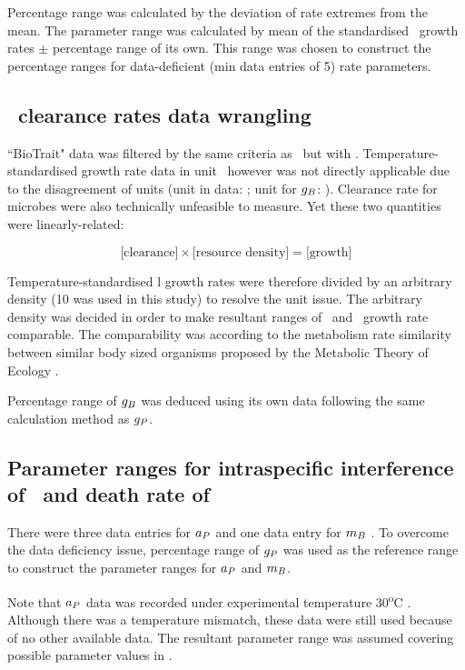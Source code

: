 \documentclass[env.tex]{subfiles}
\begin{document}
Percentage range was calculated by the deviation of rate extremes from the mean.  The parameter range was calculated by mean of the standardised \phy\ growth rates $\pm$ percentage range of its own.  This range was chosen to construct the percentage ranges for data-deficient (min data entries of 5) rate parameters.

\subsection{\Bac\ clearance rates data wrangling}
``BioTrait" data \autocite{della2013thermal} was filtered by the same criteria as \phy\ but with \bac.  Temperature-standardised growth rate data in unit \dayU\ however was not directly applicable due to the disagreement of units (unit in data: \dayU; unit for $g_B$: \denI).  Clearance rate for microbes were also technically unfeasible to measure.  Yet these two quantities were linearly-related:

\begin{equation}
    \text{[clearance]} \times \text{[resource density]} = \text{[growth]}
    \label{eq:gB}
\end{equation}

Temperature-standardised \bac l growth rates were therefore divided by an arbitrary density (10 was used in this study) to resolve the unit issue.  The arbitrary density was decided in order to make resultant ranges of \phy\ and \bac\ growth rate comparable.  The comparability was according to the metabolism rate similarity between similar body sized organisms proposed by the Metabolic Theory of Ecology \autocite{brown2004toward}.

Percentage range of $g_B$ was deduced using its own data following the same calculation method as $g_P$.

\subsection{Parameter ranges for intraspecific interference of \phy\ and death rate of \bac}
There were three data entries for $a_P$ \autocite{de2007biofixation} and one data entry for $m_B$ \autocite{cochran1988estimation}.  To overcome the data deficiency issue, percentage range of $g_P$ was used as the reference range to construct the parameter ranges for $a_P$ and $m_B$.

Note that $a_P$ data was recorded under experimental temperature 30\textsuperscript{o}C \autocite{de2007biofixation}.  Although there was a temperature mismatch, these data were still used because of no other available data.  The resultant parameter range was assumed covering possible parameter values in \temp.
\end{document}
